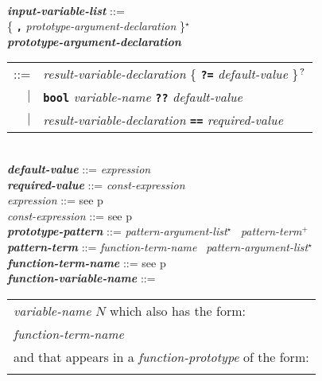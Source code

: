 \documentclass[12pt]{article}
\newcommand{\TT}[1]{{\tt \bfseries #1}}
\newcommand{\STAR}{{\Large $^\star$}}
\newcommand{\PLUS}[1][]{{$^{+#1}$}}
\newcommand{\QMARK}{{$^{\,\mbox{\footnotesize ?}}$}}
\newcommand{\emkey}[1]{{\em \bfseries #1}}
\newcommand{\pagref}[1]{p\pageref{#1}}
\newenvironment{indpar}[1][0.3in]%
	{\begin{list}{}%
		     {\setlength{\itemsep}{0in}%
		      \setlength{\topsep}{0in}%
		      \setlength{\parsep}{1ex}%
		      \setlength{\labelwidth}{#1}%
		      \setlength{\leftmargin}{#1}%
		      \addtolength{\leftmargin}{\labelsep}}%
	 \item}%
	{\end{list}}
\begin{document}
\begin{indpar}[0.1in]
\\[0.5ex]
\emkey{input-variable-list} ::= \\
\hspace*{0.5in}{\em prototype-argument-declaration}
                 \{ \TT{,} {\em prototype-argument-declaration} \}\STAR{}
\\[0.5ex]
\emkey{prototype-argument-declaration}\label{PROTOTYPE-ARGUMENT-DECLARATION} \\
\hspace*{0.5in}\begin{tabular}[t]{@{}rl@{}}
    ::= & {\em result-variable-declaration}
          \{ \TT{?=} {\em default-value} \}\QMARK{} \\
    $|$ & \TT{bool} {\em variable-name}
          \TT{??} {\em default-value} \\
    $|$ & {\em result-variable-declaration}
          \TT{==} {\em required-value} \\
    \end{tabular}
\\[0.5ex]
\emkey{default-value} ::= {\em expression}
\\[0.5ex]
\emkey{required-value} ::= {\em const-expression}
\\[0.5ex]
{\em expression} ::= see \pagref{EXPRESSION}
\\[0.5ex]
{\em const-expression} ::= see \pagref{CONST-EXPRESSION}
\\[0.5ex]
\emkey{prototype-pattern}\label{PROTOTYPE-PATTERN}
    ::= {\em pattern-argument-list}\STAR{}~ {\em pattern-term}\PLUS{}
\\[0.5ex]
\emkey{pattern-term}\label{PATTERN-TERM}
    ::= {\em function-term-name}~ {\em pattern-argument-list}\STAR{}
\\[0.5ex]
\emkey{function-term-name} ::= see \pagref{FUNCTION-TERM-NAME}
\\[0.5ex]
\emkey{function-variable-name}\label{FUNCTION-VARIABLE-NAME} ::= \\
\hspace*{0.5in}
    \begin{tabular}[t]{@{}p{5in}@{}}
    {\em variable-name} $N$ which also has the form: \\
    \hspace*{1in}{\em module-abbreviation}\QMARK{} {\em function-term-name} \\
    and that appears in a {\em function-prototype} of the form: \\
    \hspace*{1in}{\tt function $N$ = \ldots}

\end{tabular}
\end{indpar}
\end{document}
